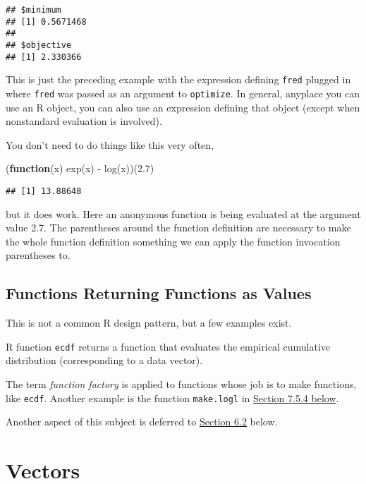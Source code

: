 \documentclass[
]{article}
\newenvironment{Shaded}{\begin{snugshade}}{\end{snugshade}}
\newcommand{\ControlFlowTok}[1]{\textcolor[rgb]{0.13,0.29,0.53}{\textbf{#1}}}
\newcommand{\FloatTok}[1]{\textcolor[rgb]{0.00,0.00,0.81}{#1}}
\newcommand{\FunctionTok}[1]{\textcolor[rgb]{0.00,0.00,0.00}{#1}}
\newcommand{\NormalTok}[1]{#1}
\newcommand{\SpecialCharTok}[1]{\textcolor[rgb]{0.00,0.00,0.00}{#1}}
\begin{document}
\begin{verbatim}
## $minimum
## [1] 0.5671468
## 
## $objective
## [1] 2.330366
\end{verbatim}

This is just the preceding example with the expression defining
\texttt{fred} plugged in where \texttt{fred} was passed as an argument
to \texttt{optimize}. In general, anyplace you can use an R object, you
can also use an expression defining that object (except when nonstandard
evaluation is involved).

You don't need to do things like this very often,

\begin{Shaded}
\begin{Highlighting}[]
\NormalTok{(}\ControlFlowTok{function}\NormalTok{(x) }\FunctionTok{exp}\NormalTok{(x) }\SpecialCharTok{{-}} \FunctionTok{log}\NormalTok{(x))(}\FloatTok{2.7}\NormalTok{)}
\end{Highlighting}
\end{Shaded}

\begin{verbatim}
## [1] 13.88648
\end{verbatim}

but it does work. Here an anonymous function is being evaluated at the
argument value 2.7. The parentheses around the function definition are
necessary to make the whole function definition something we can apply
the function invocation parentheses to.

\hypertarget{functions-returning-functions-as-values}{%
\subsection{Functions Returning Functions as
Values}\label{functions-returning-functions-as-values}}

This is not a common R design pattern, but a few examples exist.

R function \texttt{ecdf} returns a function that evaluates the empirical
cumulative distribution (corresponding to a data vector).

The term \emph{function factory} is applied to functions whose job is to
make functions, like \texttt{ecdf}. Another example is the function
\texttt{make.logl} in \protect\hyperlink{factory}{Section 7.5.4 below}.

Another aspect of this subject is deferred to
\protect\hyperlink{currying}{Section 6.2} below.

\hypertarget{vectors}{%
\section{Vectors}\label{vectors}}
\end{document}
